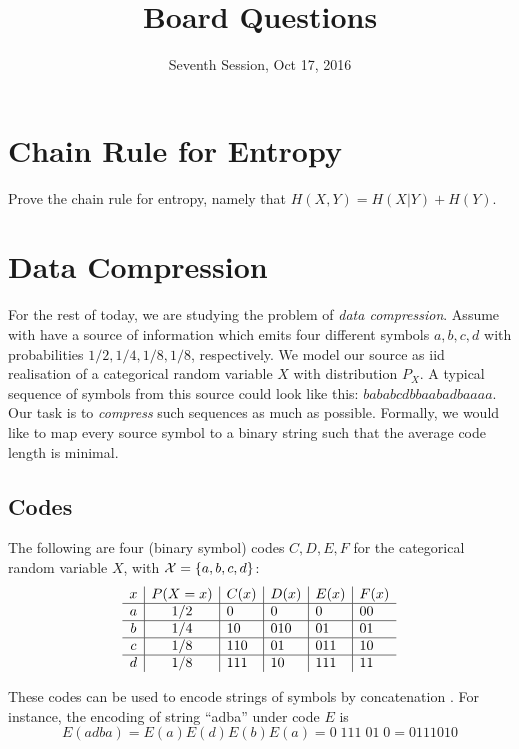 \documentclass[11p,a4paper]{article}
\title{Board Questions}
\date{Seventh Session, Oct 17, 2016}
\begin{document}
\maketitle

\section{Chain Rule for Entropy}
Prove the chain rule for entropy, namely that $H(X,Y)=H(X|Y)+H(Y)$.

\section{Data Compression}
For the rest of today, we are studying the problem of \emph{data
  compression}. Assume with have a source of information which emits
four different symbols $a,b,c,d$ with probabilities $1/2,1/4,1/8,1/8$,
respectively. We model our source as iid realisation of a
categorical random variable $X$ with distribution $P_X$. A typical
sequence of symbols from this source could look like this: $bababcdbbaabadbaaaa$.
Our task is to \emph{compress} such sequences as much as
possible. Formally, we would like to map every source symbol to a
binary string such that the average code length is minimal.


\subsection{Codes} \label{sec:codes}
The following are four (binary symbol) codes $C,D,E, F$ for the
categorical random variable $X$, with ${\cal X} = \{a,b,c,d\}$:
\[
\begin{array}{c | c | l | l | l | l}
x & P(X=x) & C(x) & D(x) & E(x) & F(x)\\
\hline
a & 1/2 & 0   & 0   & 0   & 00 \\
\hline
b & 1/4 & 10  & 010 & 01  & 01\\
\hline
c & 1/8 & 110 & 01  & 011 & 10 \\
\hline
d & 1/8 & 111 & 10  & 111 & 11 \\
\end{array}
\]

These codes can be used to encode strings of symbols by concatenation . For instance,
the encoding of string ``adba'' under code $E$ is
\[
E(adba) = E(a) E(d) E(b) E(a) = 0 \; 111 \; 01 \; 0 = 0111010
\]
\end{document}
